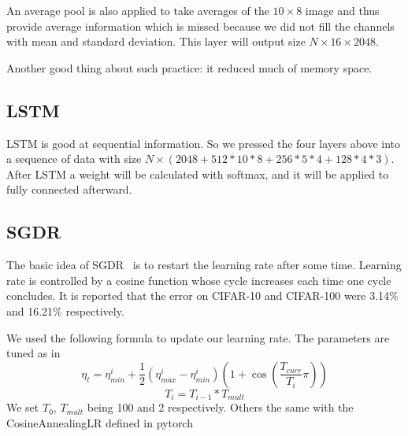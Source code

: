 \documentclass[conference,compsoc]{IEEEtran}
\begin{document}
An average pool is also applied to take averages of the $10\times8$ image and thus provide average information which is missed because we did not fill the channels with mean and standard deviation. This layer will output size $N\times 16\times 2048$.

Another good thing about such practice: it reduced much of memory space.

\subsection{LSTM}
LSTM is good at sequential information. So we pressed the four layers above into a sequence of data with size $N\times(2048+512*10*8+256*5*4+128*4*3)$. After LSTM a weight will be calculated with softmax, and it will be applied to fully connected afterward.

\subsection{SGDR}
The basic idea of SGDR~\cite{SGDR} is to restart the learning rate after some time. Learning rate is controlled by a cosine function whose cycle increases each time one cycle concludes. It is reported that the error on CIFAR-10 and CIFAR-100 were 3.14\% and 16.21\% respectively.
\par We used the following formula to update our learning rate. The parameters are tuned as in \cite{SGDR}
$$ \eta_t = \eta_{min}^i + \frac{1}{2}(\eta_{max}^i-\eta_{min}^i)(1 + \cos(\frac{T_{curr}}{T_i}\pi))$$
$$ T_{i} = T_{i-1} * T_{mult} $$
We set $T_0$, $T_{mult}$ being 100 and 2 respectively. Others the same with the CosineAnnealingLR defined in pytorch
\end{document}
